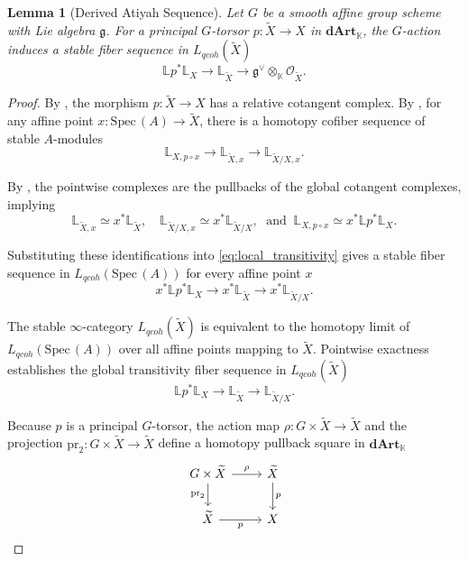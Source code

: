 \documentclass[reqno]{amsart}
\newtheorem{lemma}[theorem]{Lemma}
\theoremstyle{definition}
\theoremstyle{remark}
\newcommand{\LL}{\mathbb{L}}
\newcommand{\cO}{\mathcal{O}}
\newcommand{\K}{\mathbb{K}}
\newcommand{\Spec}{\mathrm{Spec\,}}
\newcommand{\dArt}{\mathbf{dArt}}
\begin{document}
{\begin{lemma}[Derived Atiyah Sequence] \label{lem:atiyah}
  Let $G$ be a smooth affine group scheme with Lie algebra $\mathfrak{g}$. For a principal $G$-torsor $p \colon \widetilde{X} \to X$ in $\dArt_\K$, the $G$-action induces a stable fiber sequence in $L_{qcoh}(\widetilde{X})$
  \begin{equation*}
    \mathbb{L}p^*\LL_{X} \to \LL_{\widetilde{X}} \to \mathfrak{g}^\vee \otimes_\K \cO_{\widetilde{X}}.
  \end{equation*}
\end{lemma}
\begin{proof}
  By \cite[Definition 1.4.1.15]{HAG-II}, the morphism $p \colon \widetilde{X} \to X$ has a relative cotangent complex. By \cite[Lemma 1.4.1.16(1)]{HAG-II}, for any affine point $x \colon \Spec(A) \to \widetilde{X}$, there is a homotopy cofiber sequence of stable $A$-modules
  \begin{equation} \label{eq:local_transitivity}
    \LL_{X, p \circ x} \to \LL_{\widetilde{X}, x} \to \LL_{\widetilde{X}/X, x}.
  \end{equation}
  
  By \cite[Definitions 1.4.1.7 and 1.4.1.15]{HAG-II}, the pointwise complexes are the pullbacks of the global cotangent complexes, implying $$\LL_{\widetilde{X}, x} \simeq x^* \LL_{\widetilde{X}}, \quad \LL_{\widetilde{X}/X, x} \simeq x^* \LL_{\widetilde{X}/X}, \; \text{ and } \ \LL_{X, p \circ x} \simeq x^* \mathbb{L}p^* \LL_X.$$ 
  
  Substituting these identifications into \eqref{eq:local_transitivity} gives a stable fiber sequence in $L_{qcoh}(\Spec(A))$ for every affine point $x$
  \begin{equation*}
    x^* \mathbb{L}p^* \LL_X \to x^* \LL_{\widetilde{X}} \to x^* \LL_{\widetilde{X}/X}.
  \end{equation*}
  
  The stable $\infty$-category $L_{qcoh}(\widetilde{X})$ is equivalent to the homotopy limit of $L_{qcoh}(\Spec(A))$ over all affine points mapping to $\widetilde{X}$. Pointwise exactness establishes the global transitivity fiber sequence in $L_{qcoh}(\widetilde{X})$
  \begin{equation} \label{eq:standard_transitivity}
    \mathbb{L}p^*\LL_{X} \to \LL_{\widetilde{X}} \to \LL_{\widetilde{X}/X}.
  \end{equation}
  
  Because $p$ is a principal $G$-torsor, the action map $\rho \colon G \times \widetilde{X} \to \widetilde{X}$ and the projection $\mathrm{pr}_2 \colon G \times \widetilde{X} \to \widetilde{X}$ define a homotopy pullback square in $\dArt_\K$
  \[
    \begin{tikzcd}
      G \times \widetilde{X} \arrow[r, "\rho"] \arrow[d, "\mathrm{pr}_2"'] & \widetilde{X} \arrow[d, "p"] \\
      \widetilde{X} \arrow[r, "p"'] & X
    \end{tikzcd}
  \]
  

\end{proof}}
\end{document}
